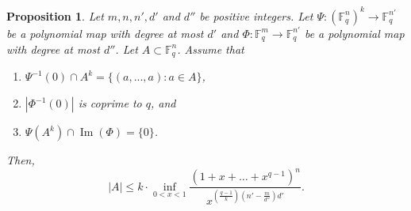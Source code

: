 \documentclass[10pt,a4paper]{amsart}
\newtheorem{proposition}{Proposition}
\newcommand{\F}{\mathbb{F}}
\DeclareMathOperator{\Ima}{Im}
\begin{document}
\begin{proposition}\label{thmB}
Let $m,n,n',d'$ and $d''$ be positive integers. Let $\Psi: (\mathbb{F}_q^n)^k \rightarrow \mathbb{F}_q^{n'}$ be a polynomial map with degree at most $d'$ and $\Phi:\mathbb{F}_q^m \rightarrow \mathbb{F}_q^{n'}$ be a polynomial map with degree at most $d''$.
Let $A \subset \F_q^n$. Assume that
    \begin{enumerate}[label=(\roman*)]
        \item $\Psi^{-1}(0)\cap A^k = \{ (a, ..., a) : a \in A \}$,
        \item $|\Phi^{-1}(0)|$ is coprime to $q$, and
        \item $\Psi(A^k) \cap \Ima(\Phi) = \{0\}$.
    \end{enumerate}
    Then,
	\begin{equation} \label{eq:prop}
		|A|\leq k \cdot \inf_{0<x<1}\frac{(1+x+\dots+x^{q-1})^n}{x^{\left(\frac{q-1}{k}\right)\left(n'-\frac{m}{d''}\right)d' }}.
	\end{equation}
\end{proposition}
\end{document}
